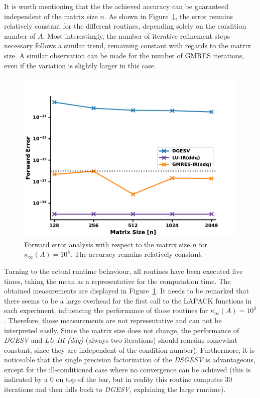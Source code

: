 It is worth mentioning that the the achieved accuracy can be guaranteed independent of the matrix size $n$. As shown in Figure~\hyperref[fig:ir3_n]{\ref{fig:ir3_n}}, the error remains relatively constant for the different routines, depending solely on the condition number of $A$. Most interestingly, the number of iterative refinement steps necessary follows a similar trend, remaining constant with regards to the matrix size. A similar observation can be made for the number of GMRES iterations, even if the variation is slightly larger in this case.

\begin{figure}[h]
    \centering
    \includegraphics[width=0.7\linewidth]{chapters/5_experiments/figures/IR3_n.pdf}
    \caption[IR - Forward Error 2]{Forward error analysis with respect to the matrix size $n$ for $\kappa_\infty(A)=10^8$. The accuracy remains relatively constant.}
    \label{fig:ir3_n}
\end{figure}

Turning to the actual runtime behaviour, all routines have been executed five times, taking the mean as a representative for the computation time. The obtained measurements are displayed in Figure~\hyperref[fig:ir3_n]{\ref{fig:ir3_n}}. It needs to be remarked that there seems to be a large overhead for the first call to the LAPACK functions in each experiment, influencing the performance of those routines for $\kappa_\infty(A)=10^2$. Therefore, those measurements are not representative and can not be interpreted easily. Since the matrix size does not change, the performance of \textit{DGESV} and \textit{LU-IR (ddq)} (always two iterations) should remains somewhat constant, since they are independent of the condition number). Furthermore, it is noticeable that the single precision factorization of the \textit{DSGESV} is advantageous, except for the ill-conditioned case where no convergence can be achieved (this is indicated by a $0$ on top of the bar, but in reality this routine computes 30 iterations and then falls back to \textit{DGESV}, explaining the large runtime).


